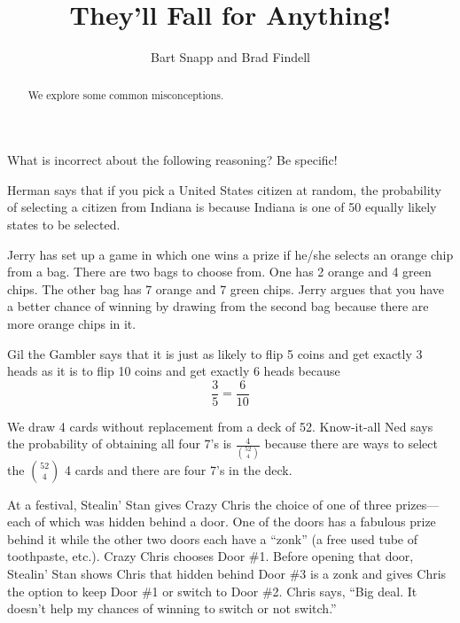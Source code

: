 \documentclass[nooutcomes]{ximera}
\title{They'll Fall for Anything!}
\author{Bart Snapp and Brad Findell}
\begin{document}
\begin{abstract}
  We explore some common misconceptions.
\end{abstract}
\maketitle

\label{A:fallForAnything}

What is incorrect about the following reasoning? Be specific!

\begin{problem}
Herman says that if you pick a United States citizen at random, the
probability of selecting a citizen from Indiana is because Indiana is
one of 50 equally likely states to be selected.
\end{problem}


\begin{problem}
Jerry has set up a game in which one wins a prize if he/she selects an
orange chip from a bag.  There are two bags to choose from.  One has 2
orange and 4 green chips.  The other bag has 7 orange and 7 green
chips.  Jerry argues that you have a better chance of winning by
drawing from the second bag because there are more orange chips in it.
\end{problem}

\begin{problem}
Gil the Gambler says that it is just as likely to flip 5 coins and get
exactly 3 heads as it is to flip 10 coins and get exactly 6 heads
because
\[
\frac{3}{5} = \frac{6}{10}
\]
\end{problem}

\begin{problem}
We draw 4 cards without replacement from a deck of 52.  Know-it-all
Ned says the probability of obtaining all four 7's is
$\frac{4}{\binom{52}{4}}$ because there are ways to select the
$\binom{52}{4}$ 4 cards and there are four 7's in the deck.
\end{problem} 

\begin{problem}
At a festival, Stealin' Stan gives Crazy Chris the choice of one of
three prizes---each of which was hidden behind a door.  One of the
doors has a fabulous prize behind it while the other two doors each
have a ``zonk'' (a free used tube of toothpaste, etc.).  Crazy Chris
chooses Door \#1.  Before opening that door, Stealin' Stan shows Chris
that hidden behind Door \#3 is a zonk and gives Chris the option to
keep Door \#1 or switch to Door \#2.  Chris says, ``Big deal.  It doesn't
help my chances of winning to switch or not switch.''
\end{problem}
\end{document}
